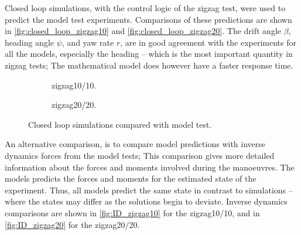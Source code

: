 Closed loop simulations, with the control logic of the zigzag test, were used to predict the model test experiments. Comparisons of these predictions are shown in \autoref{fig:closed_loop_zigzag10} and \autoref{fig:closed_loop_zigzag20}. The drift angle $\beta$, heading angle $\psi$, and yaw rate $r$, are in good agreement with the experiments for all the models, especially the heading -- which is the most important quantity in zigzag tests; The mathematical model does however have a faster response time.

\begin{figure}
    \centering
    \begin{subfigure}[b]{0.49\textwidth}
        \centering
        
        \caption{zigzag10/10.}
        \label{fig:closed_loop_zigzag10}
    \end{subfigure}
    \hfill
    \begin{subfigure}[b]{0.49\textwidth}
        \centering
        
        \caption{zigzag20/20.}
        \label{fig:closed_loop_zigzag20}
    \end{subfigure}
    \caption{Closed loop simulations compared with model test.}
    \label{fig:vct}
\end{figure}
%    
%    
An alternative comparison, is to compare model predictions with inverse dynamics forces from the model tests; This comparison gives more detailed information about the forces and moments involved during the manoeuvres. The models predicts the forces and moments for the estimated state of the experiment. Thus, all models predict the same state in contrast to simulations -- where the states may differ as the solutions begin to deviate. Inverse dynamics comparisons are shown in \autoref{fig:ID_zigzag10} for the zigzag10/10, and in \autoref{fig:ID_zigzag20} for the zigzag20/20.    
